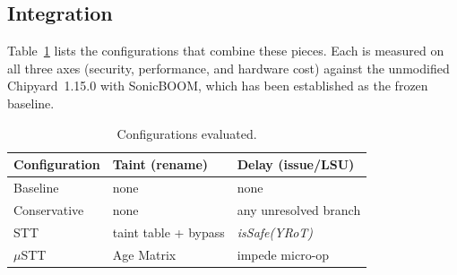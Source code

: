 \subsection{Integration}
Table~\ref{tab:configs} lists the configurations that combine these pieces. Each is measured on all 
three axes (security, performance, and hardware cost) against the unmodified Chipyard~1.15.0 with SonicBOOM, 
which has been established as the frozen baseline.

\begin{table}[t]
  \caption{Configurations evaluated.}
  \label{tab:configs}
  \small
  \begin{tabular}{@{}lll@{}}
    \toprule
    Configuration & Taint (rename) & Delay (issue/LSU) \\
    \midrule
    Baseline      & none                & none \\
    Conservative  & none                & any unresolved branch \\
    STT           & taint table + bypass & \textit{isSafe(YRoT)} \\
    $\mu$STT      & Age Matrix          & impede micro-op \\
    \bottomrule
  \end{tabular}
\end{table}
